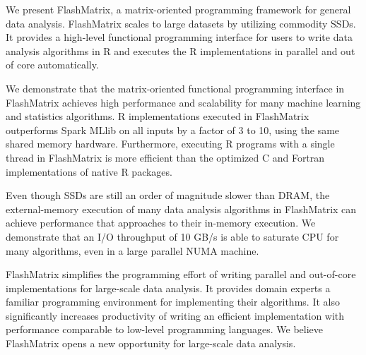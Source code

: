 We present FlashMatrix, a matrix-oriented programming framework for general
data analysis. FlashMatrix scales to large datasets by utilizing commodity SSDs.
It provides a high-level functional programming interface for users to write
data analysis algorithms in R and
executes the R implementations in parallel and out of core automatically.

We demonstrate that the matrix-oriented functional programming interface in
FlashMatrix achieves high performance and scalability for many machine learning and 
statistics algorithms.  R implementations executed in FlashMatrix outperforms
Spark MLlib on all inputs by a factor of 3 to 10, using the same shared memory hardware.
Furthermore, executing R programs with a single thread in FlashMatrix is more
efficient than the optimized C and Fortran implementations of native R packages.


Even though SSDs are still an order of magnitude slower than DRAM, the external-memory
execution of many data analysis algorithms in FlashMatrix can achieve performance
that approaches to their in-memory execution. We demonstrate that an I/O throughput
of 10 GB/s is able to saturate CPU for many algorithms, even in a large parallel
NUMA machine. 

FlashMatrix simplifies the programming effort of writing
parallel and out-of-core implementations for large-scale data analysis. It
provides domain experts a familiar programming environment for implementing
their algorithms. It also significantly
increases productivity of writing an efficient implementation with performance
comparable to low-level programming languages. We believe FlashMatrix opens
a new opportunity for large-scale data analysis.
